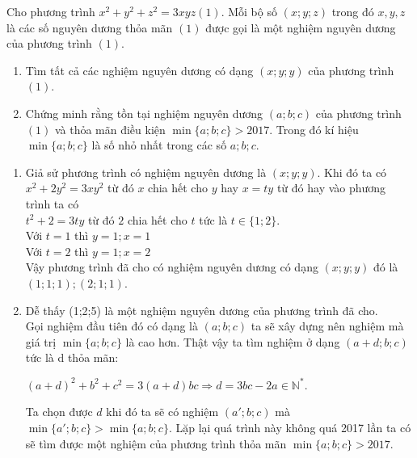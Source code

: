 \begin{ex}%
	Cho phương trình $x^2+y^2+z^2=3xyz (1)$. Mỗi bộ số $(x;y;z) $ trong đó $x,y,z$ là các số nguyên dương thỏa mãn $(1)$ được gọi là một nghiệm nguyên dương của phương trình $(1)$.
	\begin{enumerate}
		\item Tìm tất cả các nghiệm nguyên dương có dạng $(x;y;y)$ của phương trình $(1)$.
		\item Chứng minh rằng tồn tại nghiệm nguyên dương $(a;b;c)$ của phương trình $(1)$ và thỏa mãn điều kiện $\min\{a;b;c\}>2017$. Trong đó kí hiệu $\min\{a;b;c\}$ là số nhỏ nhất trong các số $a;b;c$.
	\end{enumerate}
	\loigiai
	{\begin{enumerate}
			\item Giả sử phương trình có nghiệm nguyên dương là $(x;y;y)$. Khi đó ta có\\
			$ x^2+2y^2=3xy^2$ từ đó $x$ chia hết cho $y$ hay $x=ty$ từ đó hay vào phương trình ta có\\
			$ t^2+2=3ty$ từ đó $2$ chia hết cho $t$ tức là $t\in\{1;2\}$.\\
			Với $t=1$ thì $y=1;x=1$\\
			Với $t=2$ thì $y=1;x=2$\\
			Vậy phương trình đã cho có nghiệm nguyên dương có dạng $(x;y;y) $ đó là $ (1;1;1);(2;1;1)$.
			\item  Dễ thấy (1;2;5) là một nghiệm nguyên dương của phương trình đã cho.\\
			Gọi nghiệm đầu tiên đó có dạng là $(a;b;c)$ ta sẽ xây dựng nên nghiệm mà giá trị $\min\{a;b;c\}$ là cao hơn. Thật vậy ta tìm nghiệm ở dạng $(a+d;b;c)$ tức là d thỏa mãn:
			\begin{center}
			$(a+d)^2+b^2+c^2=3(a+d)bc\Rightarrow d=3bc-2a\in \mathbb{N}^*$.
			\end{center}
			Ta  chọn được $d$ khi đó ta sẽ có nghiệm $(a';b;c)$ mà $\min\{a';b;c\}>\min\{a;b;c\}$. Lặp lại quá trình này không quá 2017 lần ta có sẽ tìm được một nghiệm của phương trình thỏa mãn $\min\{a;b;c\}>2017$.
		\end{enumerate}
	}
\end{ex}
